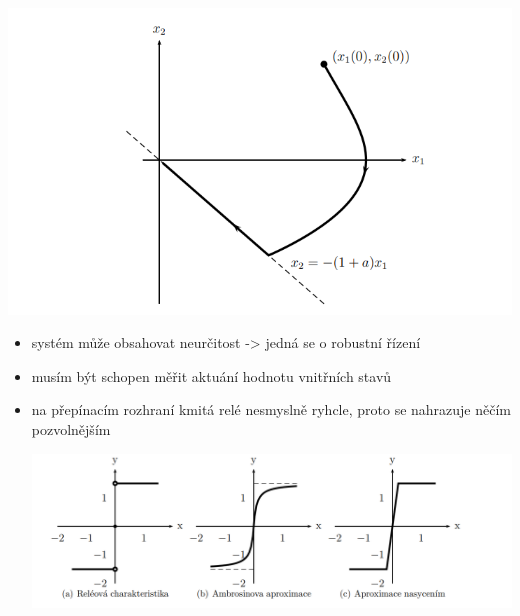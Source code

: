  \includegraphics{img/kluzavy_obr.png}

 \begin{itemize}
    \item systém může obsahovat neurčitost -> jedná se o robustní řízení
    \item musím být schopen měřit aktuání hodnotu vnitřních stavů
    \item na přepínacím rozhraní kmitá relé nesmyslně ryhcle, proto se nahrazuje něčím pozvolnějším 

    \includegraphics[scale = 0.5]{img/kluzavy_rele.png}

 \end{itemize}

